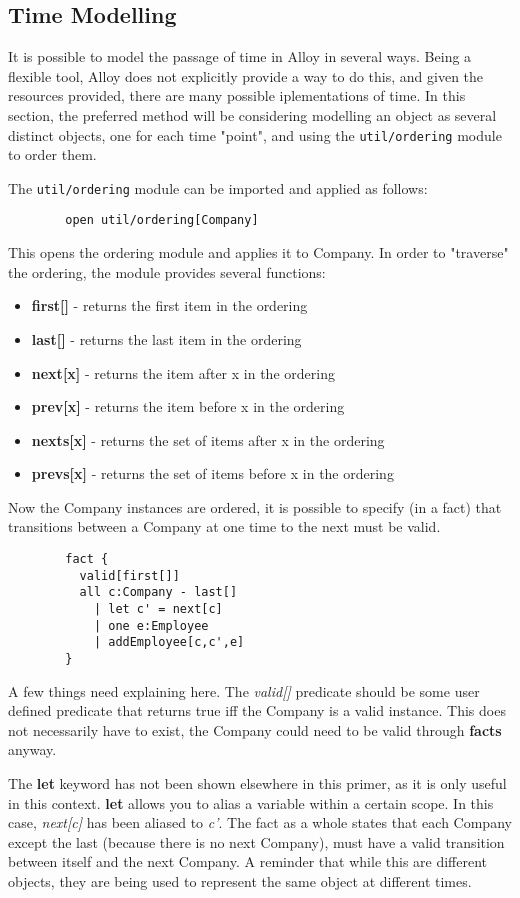 \documentclass[10pt]{article}
\begin{document}
    \subsection*{Time Modelling}
      It is possible to model the passage of time in Alloy in several ways. Being a flexible tool, Alloy does not explicitly provide a way to do this, and given the resources provided, there are many possible iplementations of time. In this section, the preferred method will be considering modelling an object as several distinct objects, one for each time "point", and using the \lstinline|util/ordering| module to order them.\par
      The \lstinline|util/ordering| module can be imported and applied as follows:
      \begin{lstlisting}
        open util/ordering[Company]
      \end{lstlisting}\par
      This opens the ordering module and applies it to Company. In order to "traverse" the ordering, the module provides several functions:
      \begin{itemize}
        \item\textbf{first[]} - returns the first item in the ordering
        \item\textbf{last[]} - returns the last item in the ordering
        \item\textbf{next[x]} - returns the item after x in the ordering
        \item\textbf{prev[x]} - returns the item before x in the ordering
        \item\textbf{nexts[x]} - returns the set of items after x in the ordering
        \item\textbf{prevs[x]} - returns the set of items before x in the ordering
      \end{itemize}\par
      Now the Company instances are ordered, it is possible to specify (in a fact) that transitions between a Company at one time to the next must be valid.
      \begin{lstlisting}
        fact {
          valid[first[]]
          all c:Company - last[]
            | let c' = next[c]
            | one e:Employee
            | addEmployee[c,c',e]
        }
      \end{lstlisting}\par
      A few things need explaining here. The \textit{valid[]} predicate should be some user defined predicate that returns true iff the Company is a valid instance. This does not necessarily have to exist, the Company could need to be valid through \textbf{facts} anyway.\par
      The \textbf{let} keyword has not been shown elsewhere in this primer, as it is only useful in this context. \textbf{let} allows you to alias a variable within a certain scope. In this case, \textit{next[c]} has been aliased to \textit{c'}. The fact as a whole states that each Company except the last (because there is no next Company), must have a valid transition between itself and the next Company. A reminder that while this are different objects, they are being used to represent the same object at different times.
\end{document}
